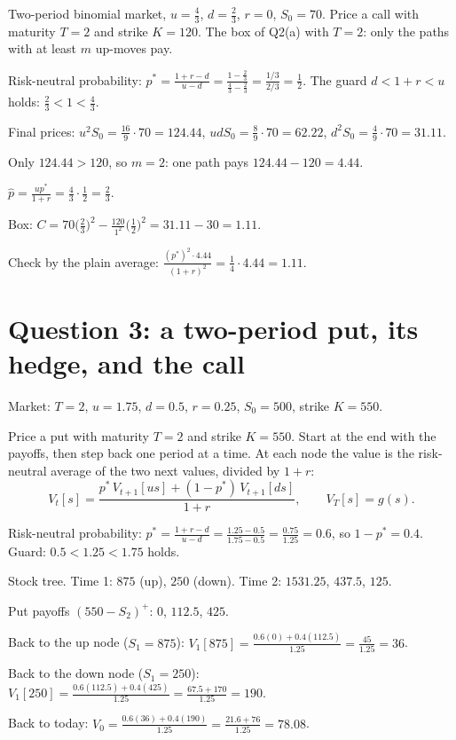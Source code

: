 \begin{problem}[Q2(b)]
Two-period binomial market, $u=\frac43$, $d=\frac23$, $r=0$, $S_0=70$. Price a call with maturity $T=2$ and strike $K=120$.
\cardsays The box of Q2(a) with $T=2$: only the paths with at least $m$ up-moves pay.
\working
\begin{steps}
\item Risk-neutral probability: $p^*=\frac{1+r-d}{u-d}=\frac{1-\frac23}{\frac43-\frac23}=\frac{1/3}{2/3}=\frac12$. The guard $d<1+r<u$ holds: $\frac23<1<\frac43$.
\item Final prices: $u^2S_0=\frac{16}9\cdot70=124.44$, $udS_0=\frac89\cdot70=62.22$, $d^2S_0=\frac49\cdot70=31.11$.
\item Only $124.44>120$, so $m=2$: one path pays $124.44-120=4.44$.
\item $\hat p=\frac{up^*}{1+r}=\frac43\cdot\frac12=\frac23$.
\item Box: $C=70\big(\tfrac23\big)^2-\frac{120}{1^2}\big(\tfrac12\big)^2=31.11-30=1.11$.
\item Check by the plain average: $\frac{(p^*)^2\cdot4.44}{(1+r)^2}=\frac14\cdot4.44=1.11$.
\end{steps}
\end{problem}

\section{Question 3: a two-period put, its hedge, and the call}

Market: $T=2$, $u=1.75$, $d=0.5$, $r=0.25$, $S_0=500$, strike $K=550$.

\begin{problem}[Q3(i)]
Price a put with maturity $T=2$ and strike $K=550$.
\cardsays Start at the end with the payoffs, then step back one period at a time. At each node the value is the risk-neutral average of the two next values, divided by $1+r$:
\[
V_t[s]=\frac{p^*\,V_{t+1}[us]+(1-p^*)\,V_{t+1}[ds]}{1+r},\qquad V_T[s]=g(s).
\]
\working
\begin{steps}
\item Risk-neutral probability: $p^*=\frac{1+r-d}{u-d}=\frac{1.25-0.5}{1.75-0.5}=\frac{0.75}{1.25}=0.6$, so $1-p^*=0.4$. Guard: $0.5<1.25<1.75$ holds.
\item Stock tree. Time 1: $875$ (up), $250$ (down). Time 2: $1531.25$, $437.5$, $125$.
\item Put payoffs $(550-S_2)^+$: $0$, $112.5$, $425$.
\item Back to the up node ($S_1=875$): $V_1[875]=\frac{0.6(0)+0.4(112.5)}{1.25}=\frac{45}{1.25}=36$.
\item Back to the down node ($S_1=250$): $V_1[250]=\frac{0.6(112.5)+0.4(425)}{1.25}=\frac{67.5+170}{1.25}=190$.
\item Back to today: $V_0=\frac{0.6(36)+0.4(190)}{1.25}=\frac{21.6+76}{1.25}=78.08$.
\end{steps}
\end{problem}

